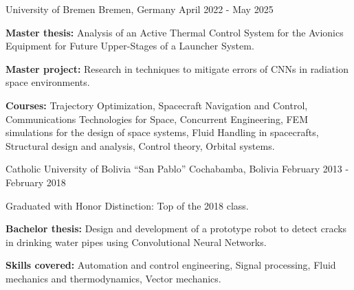 

\begin{cventries}
  {University of Bremen}
  {Bremen, Germany}
  {April 2022 - May 2025}
  {
    \begin{cvitems}
      \item \textbf{Master thesis:} Analysis of an Active Thermal
      Control System for the Avionics Equipment for Future
      Upper-Stages of a Launcher System.
      \item \textbf{Master project:} Research in techniques to
      mitigate errors of CNNs in radiation space environments.
      \item \textbf{Courses:} Trajectory Optimization, Spacecraft
      Navigation and Control, Communications Technologies for Space,
      Concurrent Engineering, FEM simulations for the design of space
      systems, Fluid Handling in spacecrafts, Structural design and
      analysis, Control theory, Orbital systems.
    \end{cvitems}
  }

  {Catholic University of Bolivia ``San Pablo''}
  {Cochabamba, Bolivia}
  {February 2013 - February 2018}
  {
    \begin{cvitems}
      \item Graduated with Honor Distinction: Top of the 2018 class.
      \item \textbf{Bachelor thesis:} Design and development of a
      prototype robot to detect cracks in drinking water
      pipes using Convolutional Neural Networks.
      \item \textbf{Skills covered:} Automation and control
      engineering, Signal processing, Fluid mechanics and
      thermodynamics, Vector mechanics.
    \end{cvitems}
  }

\end{cventries}
